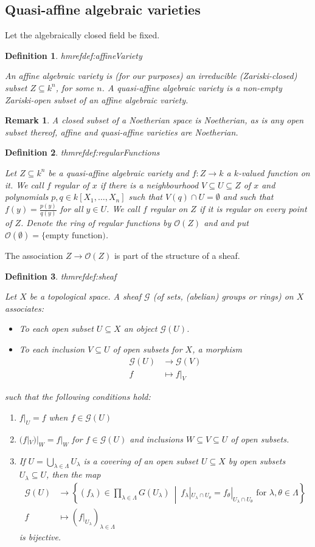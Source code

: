 \documentclass[DIV=14,parskip=full,pointednumbers]{scrartcl}
\theoremstyle{cthm}
\theoremstyle{cvarthm}
\theoremstyle{cdef}
\newtheorem{defi}{Definition}[subsection]
\newtheorem{rem}{Remark}[subsection]
\newcommand{\lbl}[1]{
	\label{#1}
	\edef\dummy{\curthm}
	\expandafter\xdef\csname thmref#1\endcsname{\dummy}
}
\newcommand{\Oo}{\mathcal{O}}
\newcommand{\Gg}{\mathcal{G}}
\newcommand{\longto}{\longrightarrow}
\newcommand{\st}{\ \middle|\ }
\begin{document}
\subsection{Quasi-affine algebraic varieties}
Let the algebraically closed field be fixed.
\begin{defi}\lbl{def:affineVariety}
 An affine algebraic variety is (for our purposes) an irreducible (Zariski-closed) subset $Z\subseteq k^n$, for some $n$. A quasi-affine algebraic variety is a non-empty Zariski-open subset of an affine algebraic variety.
\end{defi}
\begin{rem}
 A closed subset of a Noetherian space is Noetherian, as is any open subset thereof, affine and quasi-affine varieties are Noetherian.
\end{rem}
\begin{defi}\lbl{def:regularFunctions}
 Let $Z\subseteq k^n$ be a quasi-affine algebraic variety and $f: Z\to k$ a $k$-valued function on it. We call $f$ \emph{regular of $x$} if there is a neighbourhood $V\subseteq U\subseteq Z$ of $x$ and polynomials $p,q\in k[X_1,\ldots,X_n]$ such that $V(q) \cap U = \emptyset$ and such that $f(y) = \frac{p(y)}{q(y)}$ for all $y\in U$. We call $f$ \emph{regular} on $Z$ if it is regular on every point of $Z$. Denote the ring of regular functions by $\Oo(Z)$ and and put $\Oo(\emptyset)=\{\text{empty function})$.
 \end{defi}
 The association $Z\to \Oo(Z)$ is part of the structure of a sheaf.
\begin{defi}\lbl{def:sheaf}
 Let $X$ be a topological space. A \emph{sheaf} $\Gg$ (of sets, (abelian) groups or rings) on $X$ associates:
 \begin{itemize}
  \item To each open subset $U\subseteq X$ an object $\Gg(U)$.
  \item To each inclusion $V\subseteq U$ of open subsets for $X$, a morphism
  \begin{align*}
   \Gg(U) &\longto\Gg(V)\\
   f&\longmapsto f|_V
  \end{align*}
 \end{itemize}
such that the following conditions hold:
\begin{enumerate}[greek]
 \item $f|_U = f$ when $f\in \Gg(U)$
 \item $(f|_V)|_W = f|_W$ for $f\in \Gg(U)$ and inclusions $W\subseteq V\subseteq U$ of open subsets.
 \item If $U = \bigcup_{\lambda\in\Lambda} U_\lambda$ is a covering of an open subset $U\subseteq X$ by open subsets $U_\lambda \subseteq U$, then the map
 \begin{align*}\label{eq:sheafGamma}
  \Gg(U) &\longto \left\{(f_\lambda)\in \prod_{\lambda\in\Lambda} G(U_\lambda)\st f_\lambda|_{U_\lambda\cap U_\theta} = f_\theta|_{U_\lambda\cap U_\theta} \text{ for }\lambda,\theta\in \Lambda\right\}\tag{*}\\
  f &\longmapsto (f|_{U_\lambda})_{\lambda\in\Lambda}
 \end{align*}
is bijective.
\end{enumerate}
\end{defi}
\end{document}
